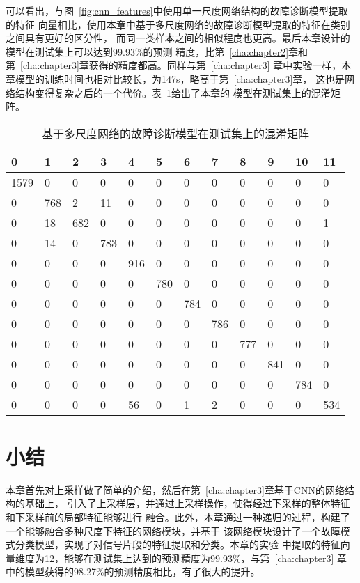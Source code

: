 可以看出，与图~\ref{fig:cnn_features}中使用单一尺度网络结构的故障诊断模型提取的特征
向量相比，使用本章中基于多尺度网络的故障诊断模型提取的特征在类别之间具有更好的区分性，
而同一类样本之间的相似程度也更高。最后本章设计的模型在测试集上可以达到99.93\%的预测
精度，比第~\ref{cha:chapter2}章和第~\ref{cha:chapter3}章获得的精度都高。同样与第~\ref{cha:chapter3}
章中实验一样，本章模型的训练时间也相对比较长，为147s，略高于第~\ref{cha:chapter3}章，
这也是网络结构变得复杂之后的一个代价。表~\ref{tab:chap4:confusion_matrix}给出了本章的
模型在测试集上的混淆矩阵。
\begin{table}[htb]
  \centering
  \begin{minipage}[t]{0.9\linewidth} %
  \caption{基于多尺度网络的故障诊断模型在测试集上的混淆矩阵}
  \label{tab:chap4:confusion_matrix}
    \begin{tabularx}{\linewidth}{XXXXXXXXXXXX}
      \toprule[1.5pt]
         0 &   1 &   2 &   3 &   4 &   5 &   6 &   7 &   8 &   9 &  10 &  11 \\\midrule[1pt]
      1579 &   0 &   0 &   0 &   0 &   0 &   0 &   0 &   0 &   0 &   0 &   0 \\
         0 & 768 &   2 &  11 &   0 &   0 &   0 &   0 &   0 &   0 &   0 &   0 \\
         0 &  18 & 682 &   0 &   0 &   0 &   0 &   0 &   0 &   0 &   0 &   1 \\
         0 &  14 &   0 & 783 &   0 &   0 &   0 &   0 &   0 &   0 &   0 &   0 \\
         0 &   0 &   0 &   0 & 916 &   0 &   0 &   0 &   0 &   0 &   0 &   0 \\
         0 &   0 &   0 &   0 &   0 & 780 &   0 &   0 &   0 &   0 &   0 &   0 \\
         0 &   0 &   0 &   0 &   0 &   0 & 784 &   0 &   0 &   0 &   0 &   0 \\
         0 &   0 &   0 &   0 &   0 &   0 &   0 & 786 &   0 &   0 &   0 &   0 \\
         0 &   0 &   0 &   0 &   0 &   0 &   0 &   0 & 777 &   0 &   0 &   0 \\
         0 &   0 &   0 &   0 &   0 &   0 &   0 &   0 &   0 & 841 &   0 &   0 \\
         0 &   0 &   0 &   0 &   0 &   0 &   0 &   0 &   0 &   0 & 784 &   0 \\
         0 &   0 &   0 &   0 &  56 &   0 &   1 &   2 &   0 &   0 &   0 & 534 \\
      \bottomrule[1.5pt]
    \end{tabularx}
  \end{minipage}
\end{table}

\section{小结}

本章首先对上采样做了简单的介绍，然后在第~\ref{cha:chapter3}章基于CNN的网络结构的基础上，
引入了上采样层，并通过上采样操作，使得经过下采样的整体特征和下采样前的局部特征能够进行
融合。此外，本章通过一种递归的过程，构建了一个能够融合多种尺度下特征的网络模块，并基于
该网络模块设计了一个故障模式分类模型，实现了对信号片段的特征提取和分类。本章的实验
中提取的特征向量维度为12，能够在测试集上达到的预测精度为99.93\%，与第~\ref{cha:chapter3}
章中的模型获得的98.27\%的预测精度相比，有了很大的提升。
